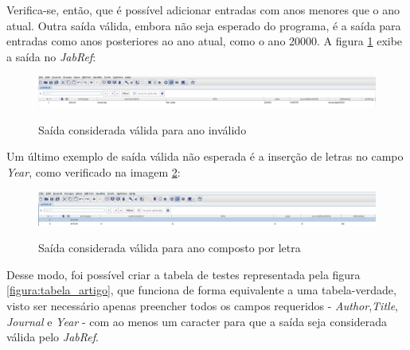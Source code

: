         Verifica-se, então, que é possível adicionar entradas com anos menores que o ano atual. Outra saída válida, embora não seja esperado do programa, é a saída para entradas como anos posteriores ao ano atual, como o ano 20000. A figura \ref{figura:base_testes_article_ano_invalido} exibe a saída no \textit{JabRef}:

    \begin{figure}[H]
        \caption{Saída considerada válida para ano inválido}
        \vspace{0.5cm}
        \centering
        \includegraphics[width=15cm]{images/base_testes_article_ano_invalido.png}
        \label{figura:base_testes_article_ano_invalido}
    \end{figure}

        Um último exemplo de saída válida não esperada é a inserção de letras no campo \textit{Year}, como verificado na imagem \ref{figura:base_testes_article_ano_caracter}:

    \begin{figure}[H]
        \caption{Saída considerada válida para ano composto por letra}
        \vspace{0.5cm}
        \centering
        \includegraphics[width=15cm]{images/base_testes_article_ano_caracter.png}
        \label{figura:base_testes_article_ano_caracter}
    \end{figure}

        Desse modo, foi possível criar a tabela de testes representada pela figura \ref{figura:tabela_artigo}, que funciona de forma equivalente a uma tabela-verdade, visto ser necessário apenas preencher todos os campos requeridos - \textit{Author},\textit{Title}, \textit{Journal} e \textit{Year} - com ao menos um caracter para que a saída seja considerada válida pelo \textit{JabRef}.

